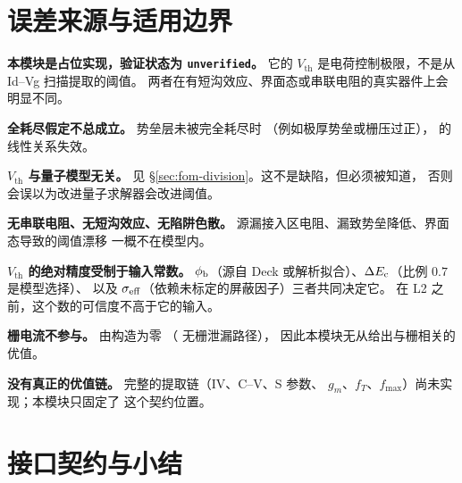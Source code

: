 \section{误差来源与适用边界}
\label{sec:fom-limits}

\limitsheading

\begin{bounds}
  \item \textbf{本模块是占位实现，验证状态为 \texttt{unverified}。}
        它的 $V_{\text{th}}$ 是电荷控制极限，不是从 Id--Vg 扫描提取的阈值。
        两者在有短沟效应、界面态或串联电阻的真实器件上会明显不同。

  \item \textbf{全耗尽假定不总成立。} 势垒层未被完全耗尽时
        （例如极厚势垒或栅压过正）， 的线性关系失效。

  \item \textbf{$V_{\text{th}}$ 与量子模型无关。} 见
        \S\ref{sec:fom-division}。这不是缺陷，但必须被知道，
        否则会误以为改进量子求解器会改进阈值。

  \item \textbf{无串联电阻、无短沟效应、无陷阱色散。}
        源漏接入区电阻、漏致势垒降低、界面态导致的阈值漂移
        一概不在模型内。

  \item \textbf{$V_{\text{th}}$ 的绝对精度受制于输入常数。}
        $\phi_{\mathrm{b}}$（源自 Deck 或解析拟合）、$\Delta E_{\mathrm{c}}$（比例 $0.7$ 是模型选择）、
        以及 $\sigma_{\mathrm{eff}}$（依赖未标定的屏蔽因子）三者共同决定它。
        在 L2 之前，这个数的可信度不高于它的输入。

  \item \textbf{栅电流不参与。}  由构造为零
        （ 无栅泄漏路径），
        因此本模块无从给出与栅相关的优值。

  \item \textbf{没有真正的优值链。} 完整的提取链（IV、C--V、S 参数、
        $g_m$、$f_T$、$f_{\max}$）尚未实现；本模块只固定了
         这个契约位置。
\end{bounds}

\section{接口契约与小结}
\label{sec:fom-interface}

